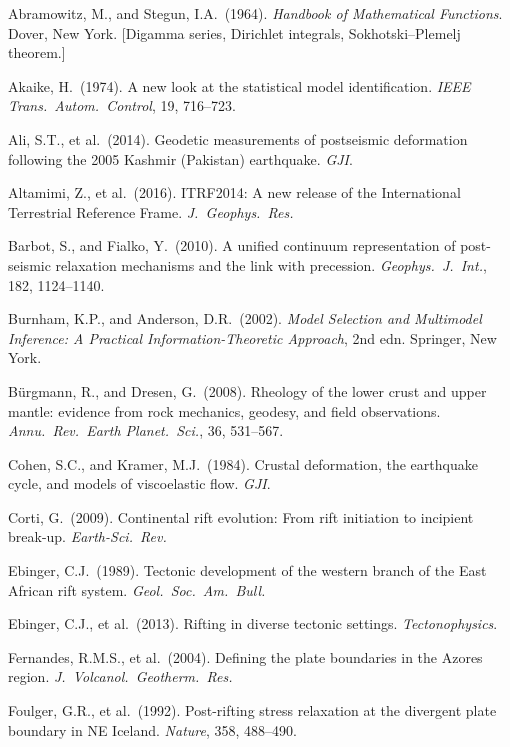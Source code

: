 \documentclass[12pt]{article}
\begin{document}
\begin{description}\itemsep0pt
  \item Abramowitz, M., and Stegun, I.A.\ (1964). \textit{Handbook of
    Mathematical Functions}. Dover, New York. [Digamma series, Dirichlet
    integrals, Sokhotski--Plemelj theorem.]
  \item Akaike, H.\ (1974). A new look at the statistical model
    identification. \textit{IEEE Trans.\ Autom.\ Control}, 19, 716--723.
  \item Ali, S.T., et al.\ (2014). Geodetic measurements of postseismic
    deformation following the 2005 Kashmir (Pakistan) earthquake. \textit{GJI}.
  \item Altamimi, Z., et al.\ (2016). ITRF2014: A new release of the
    International Terrestrial Reference Frame. \textit{J.\ Geophys.\ Res.}
  \item Barbot, S., and Fialko, Y.\ (2010). A unified continuum representation
    of post-seismic relaxation mechanisms and the link with precession.
    \textit{Geophys.\ J.\ Int.}, 182, 1124--1140.
  \item Burnham, K.P., and Anderson, D.R.\ (2002). \textit{Model Selection and
    Multimodel Inference: A Practical Information-Theoretic Approach}, 2nd edn.
    Springer, New York.
  \item B\"{u}rgmann, R., and Dresen, G.\ (2008). Rheology of the lower crust
    and upper mantle: evidence from rock mechanics, geodesy, and field
    observations. \textit{Annu.\ Rev.\ Earth Planet.\ Sci.}, 36, 531--567.
  \item Cohen, S.C., and Kramer, M.J.\ (1984). Crustal deformation, the
    earthquake cycle, and models of viscoelastic flow. \textit{GJI}.
  \item Corti, G.\ (2009). Continental rift evolution: From rift initiation
    to incipient break-up. \textit{Earth-Sci.\ Rev.}
  \item Ebinger, C.J.\ (1989). Tectonic development of the western branch of
    the East African rift system. \textit{Geol.\ Soc.\ Am.\ Bull.}
  \item Ebinger, C.J., et al.\ (2013). Rifting in diverse tectonic settings.
    \textit{Tectonophysics}.
  \item Fernandes, R.M.S., et al.\ (2004). Defining the plate boundaries in
    the Azores region. \textit{J.\ Volcanol.\ Geotherm.\ Res.}
  \item Foulger, G.R., et al.\ (1992). Post-rifting stress relaxation at the
    divergent plate boundary in NE Iceland. \textit{Nature}, 358, 488--490.

\end{description}
\end{document}
